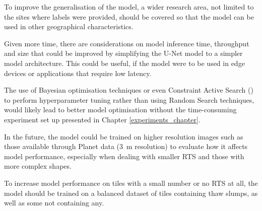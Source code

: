 To improve the generalisation of the model, a wider research area, not limited to the sites where labels were provided, should be covered so that the model can be used in other geographical characteristics.

Given more time, there are considerations on model inference time, throughput and size that could be improved by simplifying the U-Net model to a simpler model architecture. This could be useful, if the model were to be used in edge devices or applications that require low latency.

The use of Bayesian optimisation techniques or even Constraint Active Search (\cite{pmlr-v139-malkomes21a}) to perform hyperparameter tuning rather than using Random Search techniques, would likely lead to better model optimisation without the time-consuming experiment set up presented in Chapter \ref{experiments_chapter}.

In the future, the model could be trained on higher resolution images such as those available through Planet data (\SI{3}{\metre} resolution) to evaluate how it affects model performance, especially when dealing with smaller  \gls{RTS} and those with more complex shapes.

To increase model performance on tiles with a small number or no \gls{RTS}  at all, the model should be trained on a balanced dataset of tiles containing thaw slumps, as well as some not containing any.